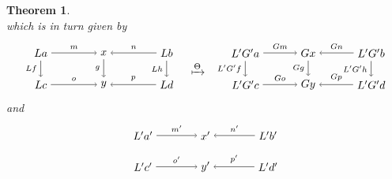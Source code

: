 \documentclass{amsart}
\newtheorem{theorem}{Theorem}[section]
\theoremstyle{remark}
\theoremstyle{definition}
\begin{document}
\begin{theorem}
\[  \]
  which is in turn given by
  \[
    \begin{tikzpicture}
      \begin{scope}
      \node (1) at (-2,1) {\( La \)};
      \node (2) at (0,1) {\( x \)};
      \node (3) at (2,1) {\( Lb \)};
      \node (4) at (-2,0) {\( Lc \)};
      \node (5) at (0,0) {\( y \)};
      \node (6) at (2,0) {\( Ld \)};
      \draw [->] (1) to node [above] {\scriptsize{\( m \)}} (2);
      \draw [->] (3) to node [above] {\scriptsize{\( n \)}} (2);
      \draw [->] (4) to node [above] {\scriptsize{\( o \)}} (5);
      \draw [->] (6) to node [above] {\scriptsize{\( p \)}} (5);
      \draw [->] (1) to node [left] {\scriptsize{\( Lf \)}} (4);
      \draw [->] (2) to node [left] {\scriptsize{\( g \)}} (5);
      \draw [->] (3) to node [left] {\scriptsize{\( Lh \)}} (6);
      \end{scope}
      \begin{scope}[shift={(3,0)}]
      \node (1) at (0,0.5) { $ \xmapsto{ \Theta } $ };
      \end{scope}
      \begin{scope}[shift={(6.5,0)}]
      \node (1) at (-2,1) {\( L'G'a \)};
      \node (2) at (0,1) {\( Gx \)};
      \node (3) at (2,1) {\( L'G'b \)};
      \node (4) at (-2,0) {\( L'G'c \)};
      \node (5) at (0,0) {\( Gy \)};
      \node (6) at (2,0) {\( L'G'd \)};
      \draw [->] (1) to node [above] {\scriptsize{\( Gm \)}} (2);
      \draw [->] (3) to node [above] {\scriptsize{\( Gn \)}} (2);
      \draw [->] (4) to node [above] {\scriptsize{\( Go \)}} (5);
      \draw [->] (6) to node [above] {\scriptsize{\( Gp \)}} (5);
      \draw [->] (1) to node [left] {\scriptsize{\( L'G'f \)}} (4);
      \draw [->] (2) to node [left] {\scriptsize{\( Gg \)}} (5);
      \draw [->] (3) to node [left] {\scriptsize{\( L'G'h \)}} (6);  
      \end{scope}
    \end{tikzpicture}
  \]
  and
  \[
    \begin{tikzpicture}
      \begin{scope}
      \node (1) at (-2,1) {\( L'a' \)};
      \node (2) at (0,1) {\( x' \)};
      \node (3) at (2,1) {\( L'b' \)};
      \node (4) at (-2,0) {\( L'c' \)};
      \node (5) at (0,0) {\( y' \)};
      \node (6) at (2,0) {\( L'd' \)};
      \draw [->] (1) to node [above] {\scriptsize{\( m' \)}} (2);
      \draw [->] (3) to node [above] {\scriptsize{\( n' \)}} (2);
      \draw [->] (4) to node [above] {\scriptsize{\( o' \)}} (5);
      \draw [->] (6) to node [above] {\scriptsize{\( p' \)}} (5);

\end{scope}
\end{tikzpicture}\]
\end{theorem}
\end{document}
